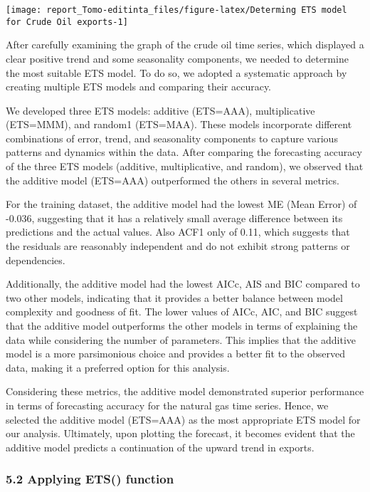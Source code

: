 \documentclass[
]{article}
\begin{document}
\begin{center}\texttt{[image: report\_Tomo-editinta\_files/figure-latex/Determing ETS model for Crude Oil exports-1]} \end{center}

After carefully examining the graph of the crude oil time series, which
displayed a clear positive trend and some seasonality components, we
needed to determine the most suitable ETS model. To do so, we adopted a
systematic approach by creating multiple ETS models and comparing their
accuracy.

We developed three ETS models: additive (ETS=AAA), multiplicative
(ETS=MMM), and random1 (ETS=MAA). These models incorporate different
combinations of error, trend, and seasonality components to capture
various patterns and dynamics within the data. After comparing the
forecasting accuracy of the three ETS models (additive, multiplicative,
and random), we observed that the additive model (ETS=AAA) outperformed
the others in several metrics.

For the training dataset, the additive model had the lowest ME (Mean
Error) of -0.036, suggesting that it has a relatively small average
difference between its predictions and the actual values. Also ACF1 only
of 0.11, which suggests that the residuals are reasonably independent
and do not exhibit strong patterns or dependencies.

Additionally, the additive model had the lowest AICc, AIS and BIC
compared to two other models, indicating that it provides a better
balance between model complexity and goodness of fit. The lower values
of AICc, AIC, and BIC suggest that the additive model outperforms the
other models in terms of explaining the data while considering the
number of parameters. This implies that the additive model is a more
parsimonious choice and provides a better fit to the observed data,
making it a preferred option for this analysis.

Considering these metrics, the additive model demonstrated superior
performance in terms of forecasting accuracy for the natural gas time
series. Hence, we selected the additive model (ETS=AAA) as the most
appropriate ETS model for our analysis. Ultimately, upon plotting the
forecast, it becomes evident that the additive model predicts a
continuation of the upward trend in exports.

\hypertarget{applying-ets-function}{%
\subsubsection{5.2 Applying ETS()
function}\label{applying-ets-function}}
\end{document}
